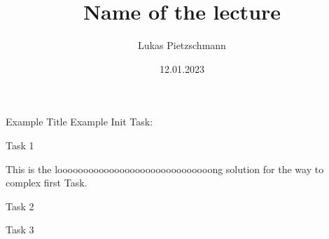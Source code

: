 \documentclass[english, uulm, solution]{exercise}
\title{Name of the lecture}
\author{Lukas Pietzschmann}
\institute{The best institute ever}
\date{12.01.2023}
\begin{document}
	\maketitle

	\begin{exercise}{Example Title}
		Example Init Task:
		\begin{tasks}
			\item Task 1
				\begin{solution}
					This is the loooooooooooooooooooooooooooooong solution for the way to complex first Task.
				\end{solution}
			\item Task 2
			\item Task 3
		\end{tasks}
	\end{exercise}
\end{document}
